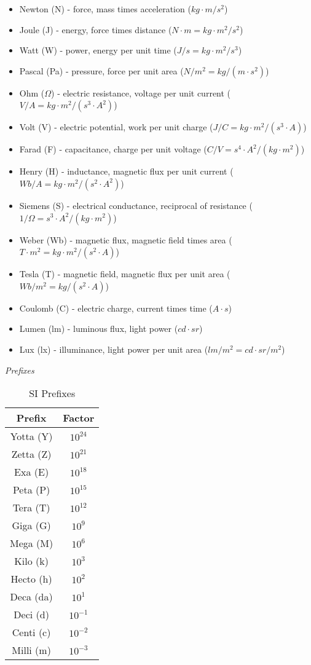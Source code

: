 \begin{itemize}
  \item Newton (N) - force, mass times acceleration ($kg \cdot m/s^2$)
  \item Joule (J) - energy, force times distance ($N \cdot m = kg \cdot m^2/s^2$)
  \item Watt (W) - power, energy per unit time ($J/s = kg \cdot m^2/s^3$)
  \item Pascal (Pa) - pressure, force per unit area ($N/m^2 = kg/(m \cdot s^2)$)
  \item Ohm ($\Omega$) - electric resistance, voltage per unit current ($V/A = kg \cdot m^2/(s^3 \cdot A^2)$)
  \item Volt (V) - electric potential, work per unit charge ($J/C = kg \cdot m^2/(s^3 \cdot A)$)
  \item Farad (F) - capacitance, charge per unit voltage ($C/V = s^4 \cdot A^2/(kg \cdot m^2)$)
  \item Henry (H) - inductance, magnetic flux per unit current ($Wb/A = kg \cdot m^2/(s^2 \cdot A^2)$)
  \item Siemens (S) - electrical conductance, reciprocal of resistance ($1/\Omega = s^3 \cdot A^2/(kg \cdot m^2)$)
  \item Weber (Wb) - magnetic flux, magnetic field times area ($T \cdot m^2 = kg \cdot m^2/(s^2 \cdot A)$)
  \item Tesla (T) - magnetic field, magnetic flux per unit area ($Wb/m^2 = kg/(s^2 \cdot A)$)
  \item Coulomb (C) - electric charge, current times time ($A \cdot s$)
  \item Lumen (lm) - luminous flux, light power ($cd \cdot sr$)
  \item Lux (lx) - illuminance, light power per unit area ($lm/m^2 = cd \cdot sr/m^2$)
\end{itemize}

\emph{Prefixes}

\begin{table}[ht]
  \centering
  \begin{tabular}{|c|c|}
  \hline
  \textbf{Prefix} & \textbf{Factor} \\
  \hline
  Yotta (Y) & $10^{24}$ \\
  Zetta (Z) & $10^{21}$ \\
  Exa (E) & $10^{18}$ \\
  Peta (P) & $10^{15}$ \\
  Tera (T) & $10^{12}$ \\
  Giga (G) & $10^{9}$ \\
  Mega (M) & $10^{6}$ \\
  Kilo (k) & $10^{3}$ \\
  Hecto (h) & $10^{2}$ \\
  Deca (da) & $10^{1}$ \\
  Deci (d) & $10^{-1}$ \\
  Centi (c) & $10^{-2}$ \\
  Milli (m) & $10^{-3}$ \\
  \hline
  \end{tabular}
  \caption{SI Prefixes}
  \label{table:si_prefixes}
  \end{table}

